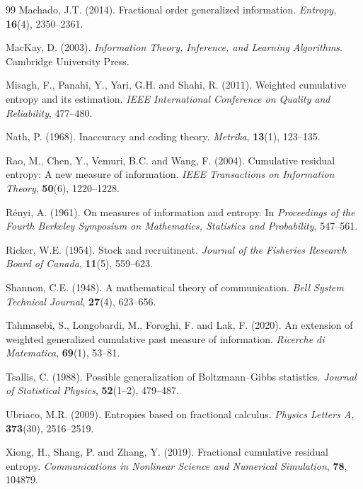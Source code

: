 \documentclass[12pt,a4paper]{article}
\numberwithin{equation}{section}
\begin{document}
\begin{thebibliography}{99}
	Machado, J.T. (2014).
	Fractional order generalized information.
	\textit{Entropy}, \textbf{16}(4), 2350--2361.
	
	MacKay, D. (2003).
	\textit{Information Theory, Inference, and Learning Algorithms}.
	Cambridge University Press.
	

	
	Misagh, F., Panahi, Y., Yari, G.H. and Shahi, R. (2011).
	Weighted cumulative entropy and its estimation.
	\textit{IEEE International Conference on Quality and Reliability}, 477--480.
	
	Nath, P. (1968).
	Inaccuracy and coding theory.
	\textit{Metrika}, \textbf{13}(1), 123--135.
	
	Rao, M., Chen, Y., Vemuri, B.C. and Wang, F. (2004).
	Cumulative residual entropy: A new measure of information.
	\textit{IEEE Transactions on Information Theory}, \textbf{50}(6), 1220--1228.
	
	Rényi, A. (1961).
	On measures of information and entropy.
	In \textit{Proceedings of the Fourth Berkeley Symposium on Mathematics, Statistics and Probability}, 547--561.
	
	Ricker, W.E. (1954).
	Stock and recruitment.
	\textit{Journal of the Fisheries Research Board of Canada}, \textbf{11}(5), 559--623.
	
	
	Shannon, C.E. (1948).
	A mathematical theory of communication.
	\textit{Bell System Technical Journal}, \textbf{27}(4), 623--656.
	
	Tahmasebi, S., Longobardi, M., Foroghi, F. and Lak, F. (2020).
	An extension of weighted generalized cumulative past measure of information.
	\textit{Ricerche di Matematica}, \textbf{69}(1), 53--81.
	
	Tsallis, C. (1988).
	Possible generalization of Boltzmann--Gibbs statistics.
	\textit{Journal of Statistical Physics}, \textbf{52}(1--2), 479--487.
	
	Ubriaco, M.R. (2009).
	Entropies based on fractional calculus.
	\textit{Physics Letters A}, \textbf{373}(30), 2516--2519.
	
	Xiong, H., Shang, P. and Zhang, Y. (2019).
	Fractional cumulative residual entropy.
	\textit{Communications in Nonlinear Science and Numerical Simulation}, \textbf{78}, 104879.
	
\end{thebibliography}
\end{document}
